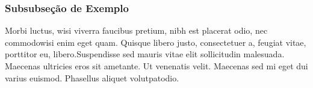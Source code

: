 \subsubsection{Subsubseção de Exemplo}
\label{subsubsec:exemplo-exemplo-exemplo}

Morbi luctus, wisi viverra faucibus pretium, nibh est placerat odio, nec commodowisi enim eget quam.  Quisque libero justo, consectetuer a, feugiat vitae, porttitor eu, libero.Suspendisse sed mauris vitae elit sollicitudin malesuada.   Maecenas ultricies eros sit ametante. Ut venenatis velit. Maecenas sed mi eget dui varius euismod. Phasellus aliquet volutpatodio.

\label{subsubsubsec:exemplo-exemplo-exemplo-exemplo}

\lipsum[12]
\lipsum[13]
\lipsum[14]

